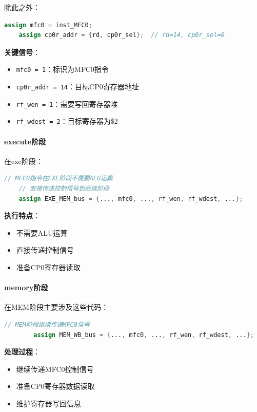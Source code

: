 \documentclass[a4paper]{article}
\begin{document}
除此之外：

\begin{lstlisting}[language=Verilog, caption=ID阶段MFC0信号生成]
    assign mfc0 = inst_MFC0;
    assign cp0r_addr = {rd, cp0r_sel};  // rd=14, cp0r_sel=0
    \end{lstlisting}

    \textbf{关键信号}：
\begin{itemize}
    \item \texttt{mfc0 = 1}：标识为MFC0指令
    \item \texttt{cp0r\_addr = 14}：目标CP0寄存器地址
    \item \texttt{rf\_wen = 1}：需要写回寄存器堆
    \item \texttt{rf\_wdest = 2}：目标寄存器为\$2
\end{itemize}

\paragraph{execute阶段} 

在exe阶段：

\begin{lstlisting}[language=Verilog, caption=EXE阶段MFC0处理]
    // MFC0指令在EXE阶段不需要ALU运算
    // 直接传递控制信号到后续阶段
    assign EXE_MEM_bus = {..., mfc0, ..., rf_wen, rf_wdest, ...};
    \end{lstlisting}

    \textbf{执行特点}：
    \begin{itemize}
        \item 不需要ALU运算
        \item 直接传递控制信号
        \item 准备CP0寄存器读取
    \end{itemize}


    \paragraph{memory阶段} 
在MEM阶段主要涉及这些代码：

    \begin{lstlisting}[language=Verilog, caption=MEM阶段MFC0处理]
        // MEM阶段继续传递MFC0信号
        assign MEM_WB_bus = {..., mfc0, ..., rf_wen, rf_wdest, ...};
        \end{lstlisting}
        
        \textbf{处理过程}：
        \begin{itemize}
            \item 继续传递MFC0控制信号
            \item 准备CP0寄存器数据读取
            \item 维护寄存器写回信息
        \end{itemize}
\end{document}
